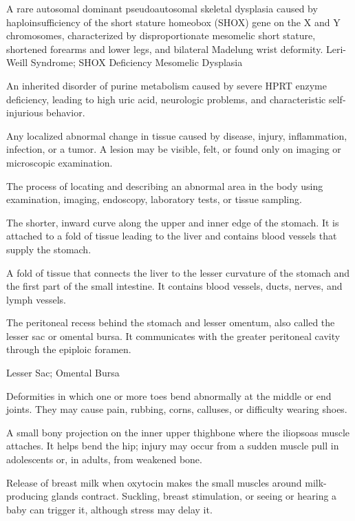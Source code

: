  A rare autosomal dominant pseudoautosomal skeletal dysplasia caused by haploinsufficiency of the short stature homeobox (SHOX) gene on the X and Y chromosomes, characterized by disproportionate mesomelic short stature, shortened forearms and lower legs, and bilateral Madelung wrist deformity.
\synonyms
Leri-Weill Syndrome; SHOX Deficiency Mesomelic Dysplasia

 An inherited disorder of purine metabolism caused by severe HPRT enzyme deficiency, leading to high uric acid, neurologic problems, and characteristic self-injurious behavior.

 Any localized abnormal change in tissue caused by disease, injury, inflammation, infection, or a tumor. A lesion may be visible, felt, or found only on imaging or microscopic examination.

 The process of locating and describing an abnormal area in the body using examination, imaging, endoscopy, laboratory tests, or tissue sampling.

 The shorter, inward curve along the upper and inner edge of the stomach. It is attached to a fold of tissue leading to the liver and contains blood vessels that supply the stomach.

 A fold of tissue that connects the liver to the lesser curvature of the stomach and the first part of the small intestine. It contains blood vessels, ducts, nerves, and lymph vessels.

 The peritoneal recess behind the stomach and lesser omentum, also called the lesser sac or omental bursa. It communicates with the greater peritoneal cavity through the epiploic foramen.

\synonyms
Lesser Sac; Omental Bursa

 Deformities in which one or more toes bend abnormally at the middle or end joints. They may cause pain, rubbing, corns, calluses, or difficulty wearing shoes.

 A small bony projection on the inner upper thighbone where the iliopsoas muscle attaches. It helps bend the hip; injury may occur from a sudden muscle pull in adolescents or, in adults, from weakened bone.

 Release of breast milk when oxytocin makes the small muscles around milk-producing glands contract. Suckling, breast stimulation, or seeing or hearing a baby can trigger it, although stress may delay it.

